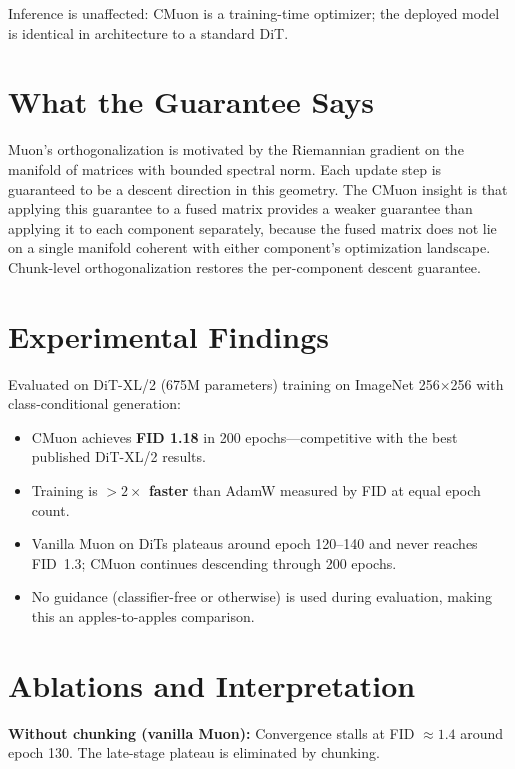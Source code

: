 \documentclass[10pt,twocolumn]{article}
\begin{document}
Inference is unaffected: CMuon is a training-time optimizer; the deployed model
is identical in architecture to a standard DiT.

\section{What the Guarantee Says}

Muon's orthogonalization is motivated by the Riemannian gradient on the manifold of
matrices with bounded spectral norm. Each update step is guaranteed to be a descent
direction in this geometry. The CMuon insight is that applying this guarantee to a
fused matrix provides a weaker guarantee than applying it to each component separately,
because the fused matrix does not lie on a single manifold coherent with either
component's optimization landscape. Chunk-level orthogonalization restores the
per-component descent guarantee.

\section{Experimental Findings}

Evaluated on DiT-XL/2 (675M parameters) training on ImageNet 256$\times$256
with class-conditional generation:

\begin{itemize}[itemsep=2pt,parsep=0pt]
  \item CMuon achieves \textbf{FID 1.18} in 200 epochs---competitive with the
    best published DiT-XL/2 results.
  \item Training is \textbf{$>2\times$ faster} than AdamW measured by FID at equal
    epoch count.
  \item Vanilla Muon on DiTs plateaus around epoch 120--140 and never reaches FID~1.3;
    CMuon continues descending through 200 epochs.
  \item No guidance (classifier-free or otherwise) is used during evaluation,
    making this an apples-to-apples comparison.
\end{itemize}

\section{Ablations and Interpretation}

\textbf{Without chunking (vanilla Muon):} Convergence stalls at FID $\approx 1.4$
around epoch 130. The late-stage plateau is eliminated by chunking.
\end{document}
